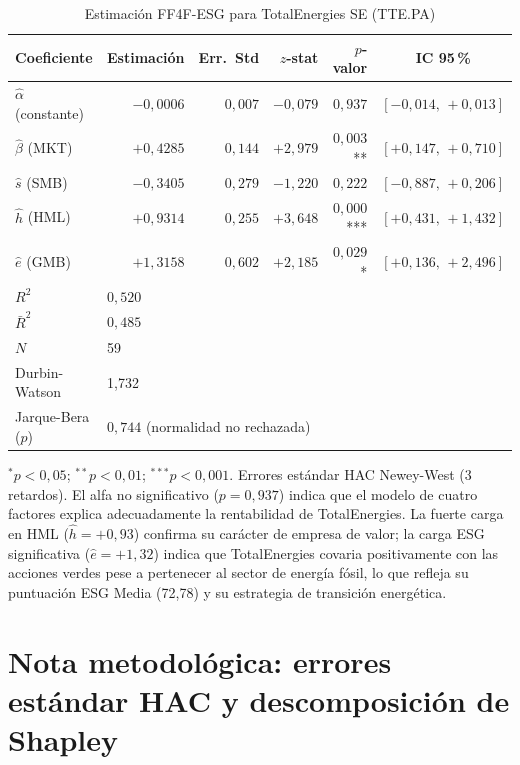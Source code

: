 \documentclass[12pt, a4paper]{article}
\begin{document}
\begin{table}[H]
  \centering
  \caption{Estimaci\'on FF4F-ESG para TotalEnergies SE (TTE.PA)}
  \label{tab:tte}
  \begin{tabular}{lrrrrc}
    \toprule
    Coeficiente & Estimaci\'on & Err.\ Std & $z$-stat & $p$-valor & IC 95\,\% \\
    \midrule
    $\hat\alpha$ (constante) & $-0{,}0006$ & $0{,}007$ & $-0{,}079$ & $0{,}937$ & $[-0{,}014,\,+0{,}013]$ \\
    $\hat\beta$ (MKT) & $+0{,}4285$ & $0{,}144$ & $+2{,}979$ & $0{,}003$** & $[+0{,}147,\,+0{,}710]$ \\
    $\hat{s}$ (SMB)   & $-0{,}3405$ & $0{,}279$ & $-1{,}220$ & $0{,}222$   & $[-0{,}887,\,+0{,}206]$ \\
    $\hat{h}$ (HML)   & $+0{,}9314$ & $0{,}255$ & $+3{,}648$ & $0{,}000$*** & $[+0{,}431,\,+1{,}432]$ \\
    $\hat{e}$ (GMB)   & $+1{,}3158$ & $0{,}602$ & $+2{,}185$ & $0{,}029$*  & $[+0{,}136,\,+2{,}496]$ \\
    \midrule
    $R^2$          & \multicolumn{5}{l}{$0{,}520$} \\
    $\bar{R}^2$    & \multicolumn{5}{l}{$0{,}485$} \\
    $N$            & \multicolumn{5}{l}{59} \\
    Durbin-Watson  & \multicolumn{5}{l}{1{,}732} \\
    Jarque-Bera ($p$) & \multicolumn{5}{l}{$0{,}744$ (normalidad no rechazada)} \\
    \bottomrule
  \end{tabular}
  \begin{minipage}{\linewidth}
    \small\vspace{0.3em}
    $^{*}p<0{,}05$; $^{**}p<0{,}01$; $^{***}p<0{,}001$. Errores est\'andar HAC
    Newey-West (3 retardos). El alfa no significativo ($p=0{,}937$) indica que el
    modelo de cuatro factores explica adecuadamente la rentabilidad de TotalEnergies.
    La fuerte carga en HML ($\hat{h}=+0{,}93$) confirma su car\'acter de empresa de
    valor; la carga ESG significativa ($\hat{e}=+1{,}32$) indica que TotalEnergies
    covaria positivamente con las acciones verdes pese a pertenecer al sector de
    energ\'ia f\'osil, lo que refleja su puntuaci\'on ESG Media (72,78) y su
    estrategia de transici\'on energ\'etica.
  \end{minipage}
\end{table}

\section{Nota metodol\'ogica: errores est\'andar HAC y descomposici\'on de Shapley}
\label{app:metodologia}
\end{document}
